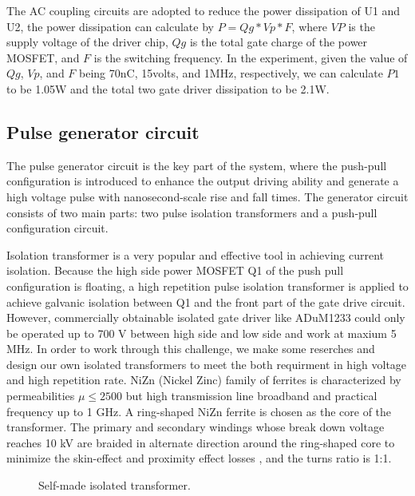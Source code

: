 \documentclass[aip,rsi,reprint,graphicx]{revtex4-1} %
\begin{document}
	The AC coupling circuits are adopted to reduce the power dissipation of U1 and U2, the power dissipation can calculate by $P= Qg*Vp*F$, where $VP$ is the supply voltage of the driver chip, $Qg$ is the total gate charge of the power MOSFET, and $F$ is the switching frequency. In the experiment, given the value of $Qg$, $Vp$, and $F$ being 70nC, 15volts, and  1MHz, respectively, we can calculate $P1$ to be 1.05W and the total two gate driver dissipation to be 2.1W.

\subsection{Pulse generator circuit}
The pulse generator circuit is the key part of the system, where the push-pull configuration is introduced to enhance the output driving ability and generate a high voltage pulse with nanosecond-scale rise and fall times. 
The generator circuit consists of two main parts: two pulse isolation transformers and a push-pull configuration circuit.

 Isolation transformer is a very popular and effective tool in achieving current isolation. 
 Because the high side power MOSFET Q1 of the push pull configuration is floating, a high repetition pulse isolation transformer is applied to achieve galvanic isolation between Q1 and the front part of the gate drive circuit. 
 However, commercially obtainable isolated gate driver like ADuM1233 could only be operated up to 700 V between high side and low side and work at maxium 5 MHz. In order to work through this challenge, we make some reserches and design our own isolated transformers to meet the both requirment in high voltage and high repetition rate.
 NiZn (Nickel Zinc) family of ferrites is characterized by permeabilities $\mu\le2500$ but high transmission line broadband and practical frequency up to 1 GHz\cite{TDKNiZn}.
 A ring-shaped NiZn ferrite is chosen as the core of the transformer.
 The primary and secondary windings whose break down voltage reaches 10 kV are braided in alternate direction around the ring-shaped core to minimize the skin-effect and proximity effect losses \cite{Dixon2001power}, and the turns ratio is 1:1.
\begin{figure}
{}  
  \caption{Self-made isolated transformer.\label{FIG7}}
\end{figure}
\end{document}
